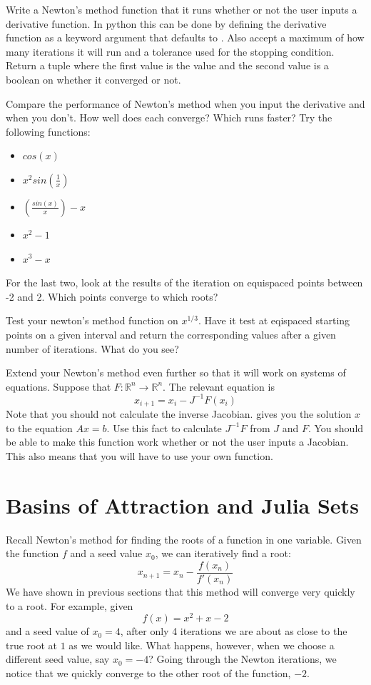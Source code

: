 \begin{problem}
Write a Newton's method function that it runs whether or not the user inputs a derivative function.
In python this can be done by defining the derivative function as a keyword argument that defaults to .
Also accept a maximum of how many iterations it will run and a tolerance used for the stopping condition.
Return a tuple where the first value is the value and the second value is a boolean on whether it converged or not.

Compare the performance of Newton's method when you input the derivative and when you don't.
How well does each converge?
Which runs faster?
Try the following functions:

\begin{itemize}
\item $cos(x)$
\item $x^2sin(\frac{1}{x})$
\item $(\frac{sin(x)}{x})-x$
\item $x^2-1$
\item $x^3 - x$
\end{itemize}

For the last two, look at the results of the iteration on equispaced points between -2 and 2.
Which points converge to which roots?
\end{problem}

\begin{problem}
Test your newton's method function on $x^{1/3}$.
Have it test at eqispaced starting points on a given interval and return the corresponding values after a given number of iterations.
What do you see?
\end{problem}

\begin{problem}
Extend your Newton's method even further so that it will work on systems of equations.
Suppose that $F: \mathbb{R}^n \rightarrow \mathbb{R}^n $.
The relevant equation is
\[
x_{i+1} = x_i - J^{-1}F(x_i)
\]
Note that you should not calculate the inverse Jacobian.
 gives you the solution $x$ to the equation $Ax=b$.
Use this fact to calculate $J^{-1}F$ from $J$ and $F$.
You should be able to make this function work whether or not the user inputs a Jacobian.
This also means that you will have to use your own  function.
\end{problem}

\section*{Basins of Attraction and Julia Sets}
Recall Newton's method for finding the roots of a function in one variable.
Given the function $f$ and a seed value $x_0$, we can iteratively find a root:
\[
x_{n+1} = x_n - \frac{f(x_n)}{f'(x_n)}
\]
We have shown in previous sections that this method will converge very quickly to a root.
For example, given
\[
f(x) = x^2 + x -2
\]
and a seed value of $x_0 = 4$, after only 4 iterations we are about as close to the true root at $1$ as we would like.
What happens, however, when we choose a different seed value, say $x_0 = -4$?
Going through the Newton iterations, we notice that we quickly converge to the other root of the function, $-2$.

